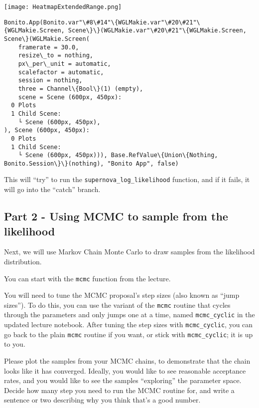 \documentclass[11pt]{article}
\begin{document}
    \begin{center}
      
      \texttt{[image: HeatmapExtendedRange.png]}
    \end{center}

    
    \begin{Verbatim}[commandchars=\\\{\}]
Bonito.App(Bonito.var"\#8\#14"\{WGLMakie.var"\#20\#21"\{WGLMakie.Screen, Scene\}\}(WGLMakie.var"\#20\#21"\{WGLMakie.Screen, Scene\}(WGLMakie.Screen(
    framerate = 30.0,
    resize\_to = nothing,
    px\_per\_unit = automatic,
    scalefactor = automatic,
    session = nothing,
    three = Channel\{Bool\}(1) (empty),
    scene = Scene (600px, 450px):
  0 Plots
  1 Child Scene:
    └ Scene (600px, 450px),
), Scene (600px, 450px):
  0 Plots
  1 Child Scene:
    └ Scene (600px, 450px))), Base.RefValue\{Union\{Nothing, Bonito.Session\}\}(nothing), "Bonito App", false)
    \end{Verbatim}

    
    This will ``try'' to run the \texttt{supernova\_log\_likelihood}
function, and if it fails, it will go into the ``catch'' branch.

    \hypertarget{part-2---using-mcmc-to-sample-from-the-likelihood}{%
\subsection{Part 2 - Using MCMC to sample from the
likelihood}\label{part-2---using-mcmc-to-sample-from-the-likelihood}}

    Next, we will use Markov Chain Monte Carlo to draw samples from the
likelihood distribution.

You can start with the \texttt{mcmc} function from the lecture.

You will need to tune the MCMC proposal's step sizes (also known as
``jump sizes''). To do this, you can use the variant of the
\texttt{mcmc} routine that cycles through the parameters and only jumps
one at a time, named \texttt{mcmc\_cyclic} in the updated lecture
notebook. After tuning the step sizes with \texttt{mcmc\_cyclic}, you
can go back to the plain \texttt{mcmc} routine if you want, or stick
with \texttt{mcmc\_cyclic}; it is up to you.

Please plot the samples from your MCMC chains, to demonstrate that the
chain looks like it has converged. Ideally, you would like to see
reasonable acceptance rates, and you would like to see the samples
``exploring'' the parameter space. Decide how many step you need to run
the MCMC routine for, and write a sentence or two describing why you
think that's a good number.
\end{document}
